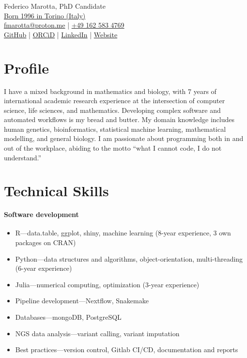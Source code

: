 \documentclass[
	DIV=23,
]{scrartcl}
\begin{document}
\begin{center}
	{ \huge Federico Marotta, PhD Candidate}\\[10px]
	\href{https://en.wikipedia.org/wiki/Turin}{ Born 1996 in Torino (Italy)}\\[4px]
	\href{mailto:fmarotta@proton.me}{ fmarotta@proton.me}
	| \href{tel:+491625834769}{ +49 162 583 4769}\\[4px]
	\href{https://github.com/fmarotta}{ GitHub}
	| \href{https://orcid.org/0000-0002-0174-3901}{ ORCiD}
	| \href{https://www.linkedin.com/in/federico-marotta-4a6b23137/}{ LinkedIn}
	| \href{https://fmarotta.net}{ Website}\\[4px]
\end{center}

\section*{Profile}

\noindent I have a mixed background in mathematics and biology, with 7 years of international academic research experience at the intersection of computer science, life sciences, and mathematics.
Developing complex software and automated workflows is my bread and butter.
My domain knowledge includes human genetics, bioinformatics, statistical machine learning, mathematical modelling, and general biology.
I am passionate about programming both in and out of the workplace, abiding to the motto \enquote{what I cannot code, I do not understand.}

\section*{Technical Skills}

\paragraph{Software development}
\begin{itemize}
	\item R---data.table, ggplot, shiny, machine learning (8-year experience, 3 own packages on CRAN)
	\item Python---data structures and algorithms, object-orientation, multi-threading (6-year experience)
	\item Julia---numerical computing, optimization (3-year experience)
	\item Pipeline development---Nextflow, Snakemake
	\item Databases---mongoDB, PostgreSQL
	\item NGS data analysis---variant calling, variant imputation
	\item Best practices---version control, Gitlab CI/CD, documentation and reports
\end{itemize}
\end{document}
